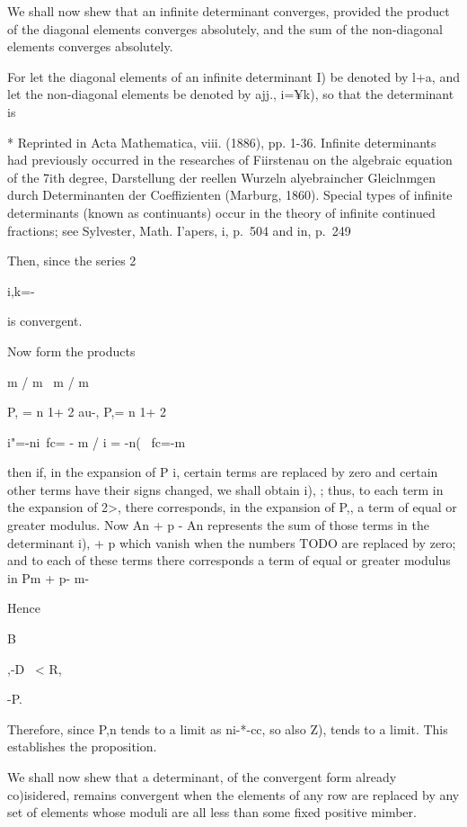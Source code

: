 
We shall now shew that an infinite determinant converges, provided the
product of the diagonal elements converges absolutely, and the sum of
the non-diagonal elements converges absolutely.

For let the diagonal elements of an infinite determinant I) be denoted
by l+a, and let the non-diagonal elements be denoted by ajj., i=¥k),
so that the determinant is

* Reprinted in Acta Mathematica, viii. (1886), pp. 1-36. Infinite
determinants had previously occurred in the researches of Fiirstenau
on the algebraic equation of the 7ith degree, Darstellung der reellen
Wurzeln alyebraincher Gleiclnmgen durch Determinanten der
Coeffizienten (Marburg, 1860). Special types of infinite determinants
(known as continuants) occur in the theory of infinite continued
fractions; see Sylvester, Math. I'apers, i, p.~504 and in, p.~249

%
%

Then, since the series  2

i,k=-

is convergent.

Now form the products

m / m \ m / m

P, = n 1+ 2 au-, P,= n 1+ 2

i"=-ni\ fc= - m / i = -n( \ fc=-m

then if, in the expansion of P i, certain terms are replaced by zero
and certain other terms have their signs changed, we shall obtain i),
; thus, to each term in the expansion of 2>, there corresponds, in
the expansion of P,, a term of equal or greater modulus. Now An + p -
An represents the sum of those terms in the determinant i), + p which
vanish when the numbers TODO are replaced by zero; and to each of
these terms there corresponds a term of equal or greater modulus in Pm
+ p- m-

Hence

B

,-D \ < R,

-P.

Therefore, since P,n tends to a limit as ni-*-cc, so also Z), tends
to a limit. This establishes the proposition.


We shall now shew that a determinant, of the convergent form already
co)isidered, remains convergent when the elements of any row are
replaced by any set of elements whose moduli are all less than some
fixed positive mimber.

